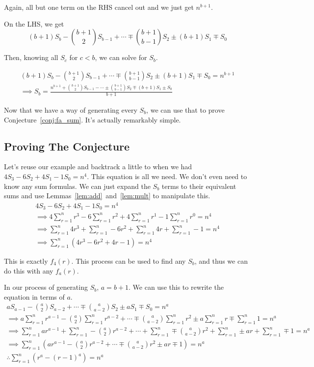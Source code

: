 \documentclass[a4paper]{article}
\newcommand{\sn}{\sum\limits_{r=1}^{n}}
\begin{document}
Again, all but one term on the RHS cancel out and we just get $n^{b+1}$.

On the LHS, we get $$(b+1)S_b - \binom{b+1}{2}S_{b-1} + \cdots \mp \binom{b+1}{b-1}S_2 \pm (b+1)S_1 \mp S_0$$

Then, knowing all $S_c$ for $c < b$, we can solve for $S_b$.

\begin{gather*}
(b+1)S_b - \binom{b+1}{2}S_{b-1} + \cdots \mp \binom{b+1}{b-1}S_2 \pm (b+1)S_1 \mp S_0 = n^{b+1}\\[0.5em]
\implies S_b  = \frac{n^{b+1} + \binom{b+1}{2}S_{b-1} - \cdots \pm \binom{b+1}{b-1}S_2 \mp (b+1) S_1 \pm S_0}{b+1}
\end{gather*}

Now that we have a way of generating every $S_b$, we can use that to prove Conjecture~\ref{conj:fa_sum}. It's actually remarkably simple.

\subsection{Proving The Conjecture}

Let's reuse our example and backtrack a little to when we had $4S_3 - 6S_2 + 4S_1 - 1S_0 = n^4$. This equation is all we need. We don't even need to know any sum formulas. We can just expand the $S_b$ terms to their equivalent sums and use Lemmas~\ref{lem:add}~and~\ref{lem:mult} to manipulate this.
\begin{gather*}
4S_3 - 6S_2 + 4S_1 - 1S_0 = n^4\\[0.5em]
\implies 4 \sn r^3 - 6 \sn r^2 + 4 \sn r^1 - 1 \sn r^0 = n^4\\[0.5em]
\implies \sn 4r^3 + \sn -6r^2 + \sn 4r + \sn -1 = n^4\\[0.5em]
\implies \sn (4r^3 - 6r^2 + 4r - 1) = n^4
\end{gather*}

This is exactly $f_4(r)$. This process can be used to find any $S_b$, and thus we can do this with any $f_a(r)$.

In our process of generating $S_b$, $a = b + 1$. We can use this to rewrite the equation in terms of $a$.
\begin{gather*}
aS_{a-1} - \binom{a}{2}S_{a-2} + \cdots \mp \binom{a}{a-2}S_2 \pm aS_1 \mp S_0 = n^a\\[0.5em]
\implies a \sn r^{a-1} - \binom{a}{2} \sn r^{a-2} + \cdots \mp \binom{a}{a-2} \sn r^2 \pm a \sn r \mp \sn 1 = n^a\\[0.5em]
\implies \sn a r^{a-1} + \sn -\binom{a}{2} r^{a-2} + \cdots + \sn \mp \binom{a}{a-2} r^2 + \sn \pm a r + \sn \mp 1 = n^a\\[0.5em]
\implies \sn \left( a r^{a-1} - \binom{a}{2} r^{a-2} + \cdots \mp \binom{a}{a-2} r^2 \pm a r \mp 1 \right) = n^a\\[0.5em]
\therefore \sn (r^a - (r-1)^a) = n^a
\end{gather*}
\end{document}
